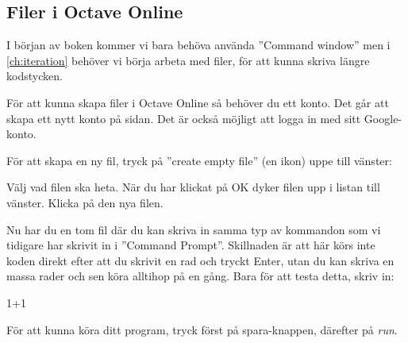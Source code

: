 \subsection{Filer i Octave Online}
I början av boken kommer vi bara behöva använda ''Command window'' men i \autoref{ch:iteration} behöver vi börja arbeta med filer, för att kunna skriva längre kodstycken.

För att kunna skapa filer i Octave Online så behöver du ett konto. Det går att skapa ett nytt konto på sidan. Det är också möjligt att logga in med sitt Google-konto.

För att skapa en ny fil, tryck på ''create empty file'' (en ikon) uppe till vänster:


Välj vad filen ska heta. När du har klickat på OK dyker filen upp i listan till vänster. Klicka på den nya filen.

Nu har du en tom fil där du kan skriva in samma typ av kommandon som vi tidigare har skrivit in i ''Command Prompt''. Skillnaden är att här körs inte koden direkt efter att du skrivit en rad och tryckt Enter, utan du kan skriva en massa rader och sen köra alltihop på en gång. Bara för att testa detta, skriv in:

\begin{matlab}[caption={Skrivit in lite matte},label={}]
1+1
\end{matlab}

För att kunna köra ditt program, tryck först på spara-knappen, därefter på \emph{run}.


